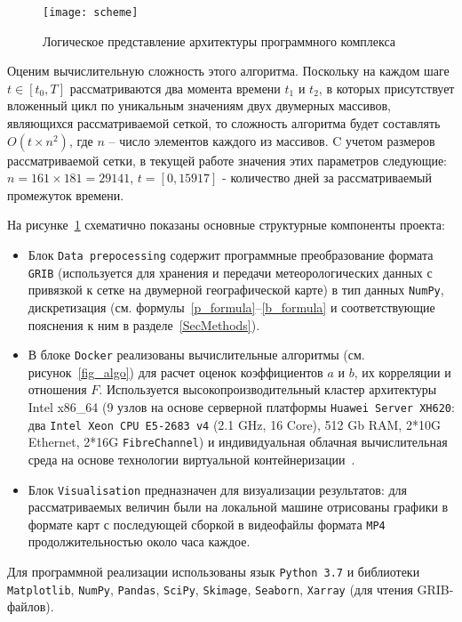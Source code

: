 \begin{figure}[!h]
	\centering
	\texttt{[image: scheme]}
	\caption{Логическое представление архитектуры программного комплекса}\label{fig_app_scheme}
\end{figure}

Оценим вычислительную сложность этого алгоритма. Поскольку на каждом шаге $t \in [t_0,T]$ рассматриваются два момента времени $t_1$ и $t_2$, в которых присутствует вложенный цикл по уникальным значениям двух двумерных массивов, являющихся рассматриваемой сеткой, то сложность алгоритма будет составлять $O(t\times n^2)$, где $n$ – число элементов каждого из массивов. C учетом размеров рассматриваемой сетки, в текущей работе значения этих параметров следующие: $n=161\times181=29141$, $t = [0, 15917]$ - количество дней за рассматриваемый промежуток времени.

На рисунке~\ref{fig_app_scheme} схематично показаны основные структурные компоненты проекта:
\begin{itemize}
	\item Блок \verb"Data prepocessing" содержит программные преобразование формата \verb"GRIB" (используется для хранения и передачи метеорологических данных с привязкой к сетке на двумерной географической карте) в тип данных \verb"NumPy", дискретизация (см. формулы~\eqref{p_formula}--\eqref{b_formula} и соответствующие пояснения к ним в разделе~\ref{SecMethods}).
	\item В блоке \verb"Docker" реализованы вычислительные алгоритмы (см. рисунок~\ref{fig_algo}) для расчет оценок коэффициентов $a$ и $b$, их корреляции и отношения $F$. Используется высокопроизводительный кластер архитектуры Intel x86\_64 (9 узлов на основе серверной платформы \verb"Huawei Server XH620": два \verb"Intel Xeon CPU E5-2683 v4" (2.1 GHz, 16 Core), 512 Gb RAM, 2*10G Ethernet, 2*16G \verb"FibreChannel") и индивидуальная облачная вычислительная среда на основе технологии виртуальной контейнеризации~\cite{peinl2016docker}.
	\item Блок \verb"Visualisation" предназначен для визуализации результатов: для рассматриваемых величин были на локальной машине отрисованы графики в формате карт с последующей сборкой в видеофайлы формата \verb"MP4" продолжительностью около часа каждое.
\end{itemize}

Для программной реализации использованы язык \verb"Python 3.7" и библиотеки \verb"Matplotlib", \verb"NumPy", \verb"Pandas", \verb"SciPy", \verb"Skimage", \verb"Seaborn", \verb"Xarray" (для чтения GRIB-файлов).

